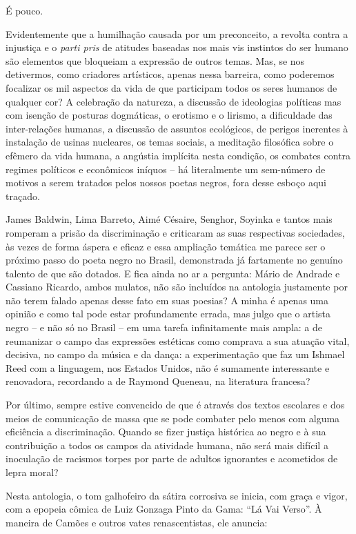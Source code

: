 \documentclass[
  letterpaper,
  DIV=11,
  numbers=noendperiod]{scrreprt}
\begin{document}
É pouco.

Evidentemente que a humilhação causada por um preconceito, a revolta
contra a injustiça e o \emph{parti pris} de atitudes baseadas nos mais
vis instintos do ser humano são elementos que bloqueiam a expressão de
outros temas. Mas, se nos detivermos, como criadores artísticos, apenas
nessa barreira, como poderemos focalizar os mil aspectos da vida de que
participam todos os seres humanos de qualquer cor? A celebração da
natureza, a discussão de ideologias políticas mas com isenção de
posturas dogmáticas, o erotismo e o lirismo, a dificuldade das
inter-relações humanas, a discussão de assuntos ecológicos, de perigos
inerentes à instalação de usinas nucleares, os temas sociais, a
meditação filosófica sobre o efêmero da vida humana, a angústia
implícita nesta condição, os combates contra regimes políticos e
econômicos iníquos -- há literalmente um sem-número de motivos a serem
tratados pelos nossos poetas negros, fora desse esboço aqui traçado.

James Baldwin, Lima Barreto, Aimé Césaire, Senghor, Soyinka e tantos
mais romperam a prisão da discriminação e criticaram as suas respectivas
sociedades, às vezes de forma áspera e eficaz e essa ampliação temática
me parece ser o próximo passo do poeta negro no Brasil, demonstrada já
fartamente no genuíno talento de que são dotados. E fica ainda no ar a
pergunta: Mário de Andrade e Cassiano Ricardo, ambos mulatos, não são
incluídos na antologia justamente por não terem falado apenas desse fato
em suas poesias? A minha é apenas uma opinião e como tal pode estar
profundamente errada, mas julgo que o artista negro -- e não só no
Brasil -- em uma tarefa infinitamente mais ampla: a de reumanizar o
campo das expressões estéticas como comprava a sua atuação vital,
decisiva, no campo da música e da dança: a experimentação que faz um
Ishmael Reed com a linguagem, nos Estados Unidos, não é sumamente
interessante e renovadora, recordando a de Raymond Queneau, na
literatura francesa?

Por último, sempre estive convencido de que é através dos textos
escolares e dos meios de comunicação de massa que se pode combater pelo
menos com alguma eficiência a discriminação. Quando se fizer justiça
histórica ao negro e à sua contribuição a todos os campos da atividade
humana, não será mais difícil a inoculação de racismos torpes por parte
de adultos ignorantes e acometidos de lepra moral?

Nesta antologia, o tom galhofeiro da sátira corrosiva se inicia, com
graça e vigor, com a epopeia cômica de Luiz Gonzaga Pinto da Gama: ``Lá
Vai Verso''. À maneira de Camões e outros vates renascentistas, ele
anuncia:
\end{document}
